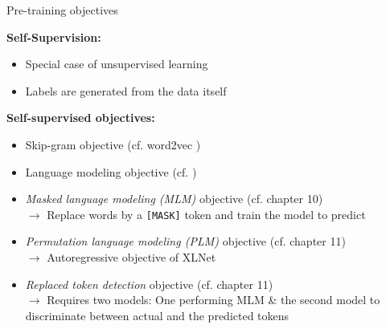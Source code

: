 \documentclass[]{beamer}
\begin{document}
\begin{frame}{Pre-training objectives}

	\textbf{Self-Supervision:}

	\begin{itemize}
		\item Special case of unsupervised learning
		\item Labels are generated from the data itself
	\end{itemize}
	
	\vspace{.3cm}
	
	\textbf{Self-supervised objectives:}
	
	\begin{itemize}
		\item Skip-gram objective (cf. word2vec \href{https://arxiv.org/pdf/1301.3781.pdf}{})
		\item Language modeling objective (cf. \href{http://www.jmlr.org/papers/volume3/bengio03a/bengio03a.pdf}{})
		\item \textit{Masked language modeling (MLM)} objective (cf. chapter 10)\\
					$\rightarrow$ Replace words by a \texttt{[MASK]} token and train the model to predict
		\item \textit{Permutation language modeling (PLM)} objective (cf. chapter 11)\\
					$\rightarrow$ Autoregressive objective of XLNet
		\item \textit{Replaced token detection} objective (cf. chapter 11)\\
					$\rightarrow$ Requires two models: One performing MLM \& the second model to discriminate between actual and the predicted tokens
	\end{itemize}
\end{frame}
\end{document}
